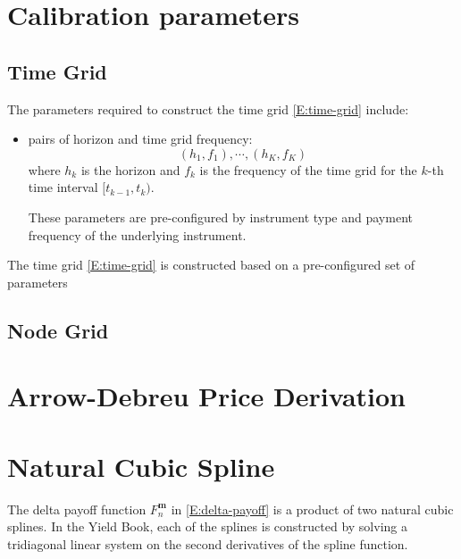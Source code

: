\documentclass{texyise}
\begin{document}
\section{Calibration parameters}

\subsection{Time Grid}
\label{S:time-grid}

The parameters required to construct the time grid \eqref{E:time-grid} include:
\begin{itemize}
    \item pairs of horizon and time grid frequency:
    \begin{equation}
        (h_1, f_1), \cdots, (h_K, f_K)
    \end{equation}
    where $h_k$ is the horizon and $f_k$ is the frequency of the time grid for the $k$-th time interval $[t_{k-1}, t_k)$.

    These parameters are pre-configured by instrument type and payment frequency of the underlying instrument. 



\end{itemize}


The time grid \eqref{E:time-grid} is constructed based on a pre-configured set of parameters



\subsection{Node Grid}
\label{S:node-grid}

\appendix

\section{Arrow-Debreu Price Derivation}
\label{S:arrow-debreu}

\section{Natural Cubic Spline}
\label{S:cubic-spline}

The delta payoff function $F_n^{\bm{m}}$ in \eqref{E:delta-payoff} is a product of two natural cubic splines. In the Yield Book, each of the splines is constructed by solving a tridiagonal linear system on the second derivatives of the spline function. 
\end{document}
